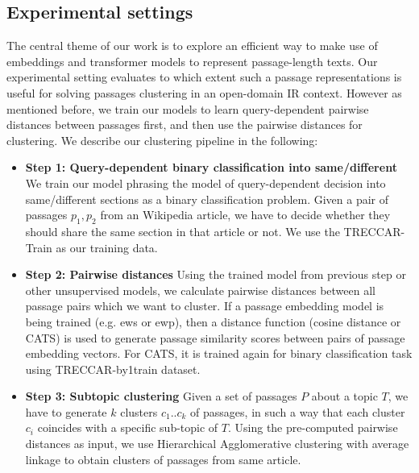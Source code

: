 \subsection{Experimental settings} The central theme of our work is to explore an efficient way to make use of embeddings and transformer models to represent passage-length texts. Our experimental setting evaluates to which extent such a passage representations is useful for solving passages clustering in an open-domain IR context.  However as mentioned before, we train our models to learn query-dependent pairwise distances between passages first, and then use the pairwise distances for clustering. We describe our clustering pipeline in the following:
\begin{itemize}
    \item \textbf{Step 1:  Query-dependent binary classification  into same/different} We train our model phrasing the model of query-dependent decision into same/different sections as a binary classification problem. Given a pair of passages $p_1, p_2$   from an Wikipedia article, we have to decide whether they should share the same section in that article or not. We use the TRECCAR-Train as our training data.
    \item \textbf{Step 2: Pairwise distances } 
    Using the trained model from previous step or other unsupervised models, we calculate pairwise distances between all passage pairs which we want to cluster. If a passage embedding model is being trained (e.g. ews or ewp), then a distance function (cosine distance or CATS) is used to generate passage similarity scores between pairs of passage embedding vectors. For CATS, it is trained again for binary classification task using TRECCAR-by1train dataset.
    \item \textbf{Step 3: Subtopic clustering} Given a set of passages $P$ about a topic $T$, we have to generate $k$ clusters $c_1 .. c_k$ of passages, in such a way that each cluster $c_i$ coincides with a specific sub-topic of $T$. Using the pre-computed pairwise distances as input, we use Hierarchical Agglomerative clustering with average linkage to obtain clusters of passages from same article.
\end{itemize}

